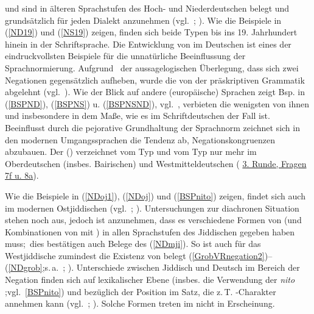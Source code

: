 \largerpage
{} und  sind in älteren Sprachstufen des Hoch- und Niederdeutschen belegt und grundsätzlich für jeden Dialekt anzunehmen (vgl.\, \citealt{Jaeger2013,Jaeger2008}; \citealt[167–230]{Weiss1998,Breitbarth2013}). Wie die Beispiele in (\ref{ND19}) und (\ref{NS19}) zeigen, finden sich beide Typen bis ins 19. Jahrhundert hinein in der Schriftsprache. Die Entwicklung von  im Deutschen ist eines der eindruckvollsten Beispiele für die unnatürliche Beeinflussung der Sprachnormierung. Aufgrund \,%
 der aussagelogischen Überlegung, dass sich zwei Negationen gegensätzlich aufheben, wurde die  von der präskriptiven Grammatik abgelehnt (vgl.\, \citealt[171]{Weiss1998}). Wie der Blick auf andere (europäische) Sprachen zeigt Bsp. in (\ref{BSPND}), (\ref{BSPNS}) u. (\ref{BSPNSND}), vgl.\, \citealt{Willisetal2013}, verbieten die wenigsten von ihnen  und insbesondere  in dem Maße, wie es im Schriftdeutschen der Fall ist. Beeinflusst durch die pejorative Grundhaltung der Sprachnorm zeichnet sich in den modernen Umgangssprachen die Tendenz ab, Negationskongruenzen \,%
 abzubauen. Der  () verzeichnet  vom Typ   und  vom Typ   nur mehr im Oberdeutschen (insbes. Bairischen) und Westmitteldeutschen ( \href{http://www.atlas-alltagssprache.de/runde-3/f07f-f08a/}{3. Runde, Fragen 7f u. 8a}).
 
 Wie die Beispiele in (\ref{NDoj1}), (\ref{NDoj}) und (\ref{BSPnito}) zeigen, findet sich auch im modernen Ostjiddischen  (vgl.\, \citealt[393–394]{Mark1978}; \citealt{AuweraGybels2014}). Untersuchungen zur diachronen Situation stehen noch aus, jedoch ist anzunehmen, dass es verschiedene Formen von  (und Kombinationen von  mit ) in allen Sprachstufen des Jiddischen gegeben haben muss;\, dies bestätigen auch Belege des  (\ref{NDmji}). So ist auch für das Westjiddische zumindest die Existenz von  belegt (\ref{GrobVRnegation2})–(\ref{NDgrob};s.\,a.\, \citealt{LockwoodBaviskar1975}; \citealt[68]{Reershemius2007}).  
Unterschiede zwischen Jiddisch und Deutsch im Bereich der Negation finden sich auf lexikalischer Ebene (insbes. die Verwendung der  {} \textit{nito} ;vgl.\, \ref{BSPnito}) und bezüglich der Position im Satz, die z.\,T. \hai{{\VO}}-Charakter annehmen kann (vgl.\, \citealt[99–225]{Vikner2001}; \citealt[57f]{Schaefer2010}). Solche Formen treten im \hai{{\LiJi}} nicht in Erscheinung. 

